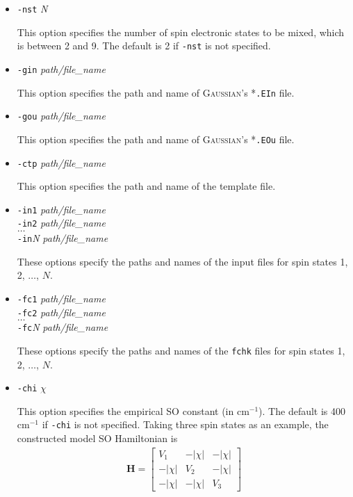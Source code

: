 \documentclass[UTF8]{article}
\begin{document}
\begin{itemize}[leftmargin= 0 pt]
\item \verb|-nst| \textit{N}

This option specifies the number of spin electronic states to be mixed, which is between 2 and 9.
 The default is 2 if \verb|-nst| is not specified.

\item \verb|-gin| \textit{path/file\_name}

This option specifies the path and name of \textsc{Gaussian}'s *\verb|.EIn| file.

\item \verb|-gou| \textit{path/file\_name}

This option specifies the path and name of \textsc{Gaussian}'s *\verb|.EOu| file.

\item \verb|-ctp| \textit{path/file\_name}

This option specifies the path and name of the template file.

\item \verb|-in1| \textit{path/file\_name} \\
 \verb|-in2| \textit{path/file\_name} \\
 $\ldots$ \\
 \verb|-in|\textit{N} \textit{path/file\_name}

These options specify the paths and names of the input files for spin states 1, 2, $\ldots$, $N$.

\item \verb|-fc1| \textit{path/file\_name} \\
 \verb|-fc2| \textit{path/file\_name} \\
 $\ldots$ \\
 \verb|-fc|\textit{N} \textit{path/file\_name}

These options specify the paths and names of the \verb|fchk| files for spin states 1, 2, $\ldots$, $N$.

\item \verb|-chi| \textit{$\chi$}

This option specifies the empirical SO constant (in cm$^{-1}$). The default is 400 cm$^{-1}$ if \verb|-chi| is not specified.
Taking three spin states as an example, the constructed model SO Hamiltonian is
\begin{align}\label{hso0-eq1}
\mathbf{H} = \left[\begin{array}{ccc}
    V_1 & -|\chi| & -|\chi| \\
    -|\chi| & V_2 & -|\chi| \\
    -|\chi| & -|\chi| & V_3
\end{array}\right]
\end{align}


\end{itemize}
\end{document}
